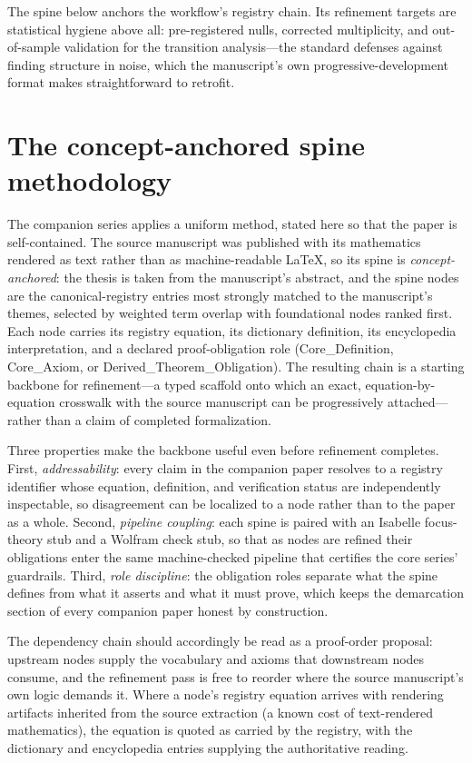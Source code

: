 \documentclass[11pt]{article}
\theoremstyle{remark}
\begin{document}
The spine below anchors the workflow's registry chain. Its refinement targets are statistical hygiene above all: pre-registered nulls, corrected multiplicity, and out-of-sample validation for the transition analysis---the standard defenses against finding structure in noise, which the manuscript's own progressive-development format makes straightforward to retrofit.

\section{The concept-anchored spine methodology}
\label{sec:method}

The companion series applies a uniform method, stated here so that the paper is self-contained. The source manuscript was published with its mathematics rendered as text rather than as machine-readable LaTeX, so its spine is \emph{concept-anchored}: the thesis is taken from the manuscript's abstract, and the spine nodes are the canonical-registry entries most strongly matched to the manuscript's themes, selected by weighted term overlap with foundational nodes ranked first. Each node carries its registry equation, its dictionary definition, its encyclopedia interpretation, and a declared proof-obligation role (Core\_Definition, Core\_Axiom, or Derived\_Theorem\_Obligation). The resulting chain is a starting backbone for refinement---a typed scaffold onto which an exact, equation-by-equation crosswalk with the source manuscript can be progressively attached---rather than a claim of completed formalization.

Three properties make the backbone useful even before refinement completes. First, \emph{addressability}: every claim in the companion paper resolves to a registry identifier whose equation, definition, and verification status are independently inspectable, so disagreement can be localized to a node rather than to the paper as a whole. Second, \emph{pipeline coupling}: each spine is paired with an Isabelle focus-theory stub and a Wolfram check stub, so that as nodes are refined their obligations enter the same machine-checked pipeline that certifies the core series' guardrails. Third, \emph{role discipline}: the obligation roles separate what the spine defines from what it asserts and what it must prove, which keeps the demarcation section of every companion paper honest by construction.

The dependency chain should accordingly be read as a proof-order proposal: upstream nodes supply the vocabulary and axioms that downstream nodes consume, and the refinement pass is free to reorder where the source manuscript's own logic demands it. Where a node's registry equation arrives with rendering artifacts inherited from the source extraction (a known cost of text-rendered mathematics), the equation is quoted as carried by the registry, with the dictionary and encyclopedia entries supplying the authoritative reading.
\end{document}

